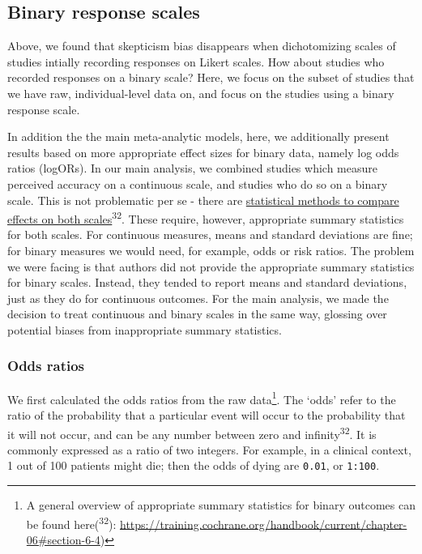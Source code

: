 \documentclass[
  man]{apa6}
\begin{document}
\subsection{Binary response scales}\label{binary-response-scales}

Above, we found that skepticism bias disappears when dichotomizing scales of studies intially recording responses on Likert scales. How about studies who recorded responses on a binary scale? Here, we focus on the subset of studies that we have raw, individual-level data on, and focus on the studies using a binary response scale.

In addition the the main meta-analytic models, here, we additionally present results based on more appropriate effect sizes for binary data, namely log odds ratios (logORs). In our main analysis, we combined studies which measure perceived accuracy on a continuous scale, and studies who do so on a binary scale. This is not problematic per se - there are \href{https://training.cochrane.org/handbook/current/chapter-10\#section-10-6}{statistical methods to compare effects on both scales}\textsuperscript{32}. These require, however, appropriate summary statistics for both scales. For continuous measures, means and standard deviations are fine; for binary measures we would need, for example, odds or risk ratios. The problem we were facing is that authors did not provide the appropriate summary statistics for binary scales. Instead, they tended to report means and standard deviations, just as they do for continuous outcomes. For the main analysis, we made the decision to treat continuous and binary scales in the same way, glossing over potential biases from inappropriate summary statistics.

\subsubsection{Odds ratios}\label{odds-ratios}

We first calculated the odds ratios from the raw data\footnote{A general overview of appropriate summary statistics for binary outcomes can be found here(\textsuperscript{32}): \url{https://training.cochrane.org/handbook/current/chapter-06\#section-6-4})}. The `odds' refer to the ratio of the probability that a particular event will occur to the probability that it will not occur, and can be any number between zero and infinity\textsuperscript{32}. It is commonly expressed as a ratio of two integers. For example, in a clinical context, 1 out of 100 patients might die; then the odds of dying are \texttt{0.01}, or \texttt{1:100}.
\end{document}
